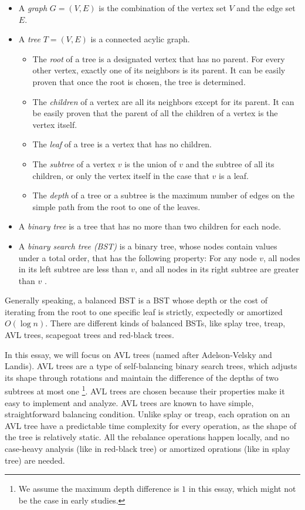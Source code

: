 \documentclass[12pt]{article}
\begin{document}
\begin{itemize} %
    \item A \textit{graph} $G = (V, E)$ is the combination of the vertex set $V$ and the edge set $E$.
    \item A \textit{tree} $T = (V, E)$ is a connected acylic graph.
            \begin{itemize}
                \item The \textit{root} of a tree is a designated vertex that has no parent. For every other vertex, exactly one of its neighbors is its parent. It can be easily proven that once the root is chosen, the tree is determined.
                \item The \textit{children} of a vertex are all its neighbors except for its parent. It can be easily proven that the parent of all the children of a vertex is the vertex itself.
                \item The \textit{leaf} of a tree is a vertex that has no children.
                \item The \textit{subtree} of a vertex $v$ is the union of $v$ and the subtree of all its children, or only the vertex itself in the case that $v$ is a leaf.
                \item The \textit{depth} of a tree or a subtree is the maximum number of edges on the simple path from the root to one of the leaves.
            \end{itemize}
    \item A \textit{binary tree} is a tree that has no more than two children for each node.
    \item A \textit{binary search tree (BST)} is a binary tree, whose nodes contain values under a total order, that has the following property: For any node $v$, all nodes in its left subtree are less than $v$, and all nodes in its right subtree are greater than $v$ \cite{CLRS}.
\end{itemize}

Generally speaking, a balanced BST is a BST whose depth or the cost of iterating from the root to one specific leaf is strictly, expectedly or amortized $O(\log n)$. There are different kinds of balanced BSTs, like splay tree, treap, AVL trees, scapegoat trees and red-black trees.

In this essay, we will focus on AVL trees (named after Adelson-Velsky and Landis). AVL trees are a type of self-balancing binary search trees, which adjusts its shape through rotations and maintain the difference of the depths of two subtrees at most one \cite{avl}\footnote{We assume the maximum depth difference is $1$ in this essay, which might not be the case in early studies.}.  AVL trees are chosen because their properties make it easy to implement and analyze. AVL trees are known to have simple, straightforward balancing condition. Unlike splay or treap, each opration on an AVL tree have a predictable time complexity for every operation, as the shape of the tree is relatively static. All the rebalance operations happen locally, and no case-heavy analysis (like in red-black tree) or amortized oprations (like in splay tree) are needed.
\end{document}
